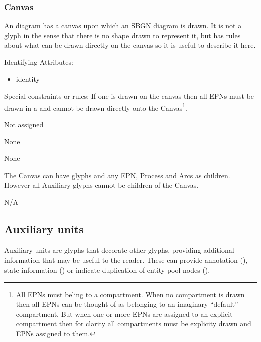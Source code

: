 \subsubsection{Canvas}

An \PD diagram has a canvas upon which an SBGN diagram is drawn. It is
not a glyph in the sense that there is no shape drawn to represent it,
but \SBGNPDLone has rules about what can be drawn directly on the canvas so
it is useful to describe it here.

\begin{glyphDescription}
\item[Identifying Attributes:]\mbox{}
  \begin{itemize}
  \item identity
 \end{itemize}
\item[Special constraints or rules:]\mbox{}\newline If one
   is drawn on the canvas then all EPNs must be
  drawn in a  and cannot be drawn directly onto the
  Canvas\footnote{All EPNs must beling to a compartment. When no compartment is drawn then all EPNs can be
    thought of as belonging to an imaginary ``default''
    compartment. But when one or more EPNs are assigned to an explicit
  compartment then for clarity all compartments must be explicity
  drawn and EPNs assigned to them.}.

\glyphSboTerm Not assigned

\glyphContainer None

\glyphLabel None

\glyphAux The Canvas can have  glyphs and any EPN,
Process and Arcs as children. However all Auxiliary glyphs cannot be
children of the Canvas.
 
\glyphCloning N/A

\end{glyphDescription}



\subsection{Auxiliary units}

Auxiliary units are glyphs that decorate other glyphs, providing additional information that may be useful to the reader. These can provide annotation (), state information () or indicate duplication of entity pool nodes ().

